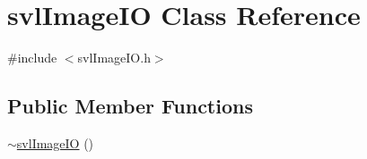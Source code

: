 \hypertarget{classsvl_image_i_o}{}\section{svl\+Image\+I\+O Class Reference}
\label{classsvl_image_i_o}


{\ttfamily \#include $<$svl\+Image\+I\+O.\+h$>$}

\subsection*{Public Member Functions}
\begin{DoxyCompactItemize}
\item 
\hyperlink{classsvl_image_i_o_a37add86266f1dc348291619e3116efb9}{$\sim$svl\+Image\+I\+O} ()
\end{DoxyCompactItemize}
